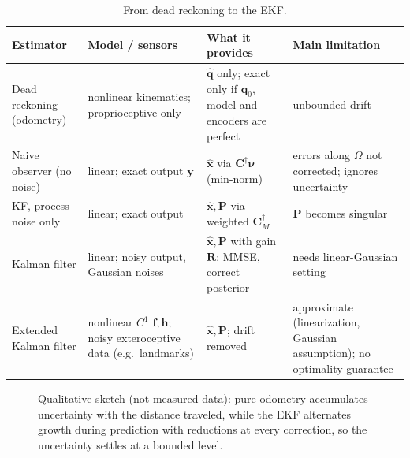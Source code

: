 \documentclass[11pt,a4paper]{article}
\newcommand{\hx}{\hat{\boldsymbol{x}}}
\newcommand{\hq}{\hat{\boldsymbol{q}}}
\newcommand{\bq}{\boldsymbol{q}}
\newcommand{\by}{\boldsymbol{y}}
\newcommand{\bnu}{\boldsymbol{\nu}}
\newcommand{\mC}{\mathbf{C}}
\newcommand{\mP}{\mathbf{P}}
\newcommand{\mR}{\mathbf{R}}
\newcommand{\pinv}{^{\dagger}}
\theoremstyle{plain}
\theoremstyle{definition}
\theoremstyle{remark}
\begin{document}
\begin{table}[htbp]
\centering
\small
\renewcommand{\arraystretch}{1.25}
\begin{tabularx}{\textwidth}{@{}>{\raggedright\arraybackslash}p{2.6cm}>{\raggedright\arraybackslash}X>{\raggedright\arraybackslash}X>{\raggedright\arraybackslash}X@{}}
\toprule
\textbf{Estimator} & \textbf{Model / sensors} & \textbf{What it provides} & \textbf{Main limitation}\\
\midrule
Dead reckoning (odometry) & nonlinear kinematics; proprioceptive only & $\hq$ only; exact only if $\bq_0$, model and encoders are perfect & unbounded drift\\
Naive observer (no noise) & linear; exact output $\by$ & $\hx$ via $\mC\pinv\bnu$ (min-norm) & errors along $\Omega$ not corrected; ignores uncertainty\\
KF, process noise only & linear; exact output & $\hx,\mP$ via weighted $\mC_M\pinv$ & $\mP$ becomes singular\\
Kalman filter & linear; noisy output, Gaussian noises & $\hx,\mP$ with gain $\mR$; MMSE, correct posterior & needs linear-Gaussian setting\\
Extended Kalman filter & nonlinear $C^1$ $\boldsymbol f,\boldsymbol h$; noisy exteroceptive data (e.g.\ landmarks) & $\hx,\mP$; drift removed & approximate (linearization, Gaussian assumption); no optimality guarantee\\
\bottomrule
\end{tabularx}
\caption{From dead reckoning to the EKF.}
\end{table}

\begin{figure}[H]
\centering
{}
\caption{Qualitative sketch (not measured data): pure odometry accumulates uncertainty with the distance traveled, while the EKF alternates
growth during prediction with reductions at every correction, so the uncertainty settles at a bounded level.}\label{fig:summary}
\end{figure}
\end{document}
